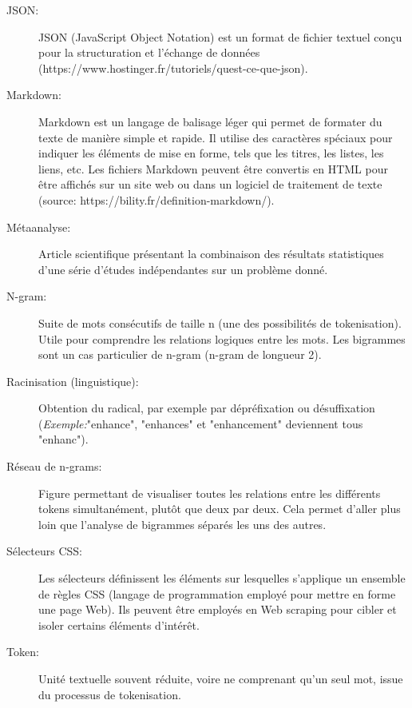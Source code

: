 \documentclass{book}
\begin{document}
\begin{description}

    \item[JSON:] JSON (JavaScript Object Notation) est un format de fichier textuel conçu pour la structuration et l’échange de données (https://www.hostinger.fr/tutoriels/quest-ce-que-json).

    \item[Markdown:] Markdown est un langage de balisage léger qui permet de
        formater du texte de manière simple et rapide. Il utilise des caractères
        spéciaux pour indiquer les éléments de mise en forme, tels que les titres, les
        listes, les liens, etc. Les fichiers Markdown peuvent être convertis en HTML
        pour être affichés sur un site web ou dans un logiciel de traitement de texte
        (source: https://bility.fr/definition-markdown/).

    \item[Métaanalyse:] Article scientifique présentant la combinaison des résultats statistiques d'une série d'études indépendantes sur un problème donné. 

    \item[N-gram:] Suite de mots consécutifs de taille n (une des possibilités
        de tokenisation). Utile pour comprendre les relations logiques entre les mots. Les bigrammes sont un cas particulier de n-gram (n-gram de longueur 2).

    \item [Racinisation (linguistique):] Obtention du radical, par exemple par dépréfixation ou \sloppy désuffixation (\textit{Exemple:}"enhance", "enhances" et "enhancement" deviennent tous "enhanc").
    
    \item [Réseau de n-grams:] Figure permettant de visualiser toutes les relations entre les différents tokens simultanément, plutôt que deux par deux. Cela permet d'aller plus loin que l'analyse de bigrammes séparés les uns des autres.

    \item[Sélecteurs CSS:] Les sélecteurs définissent les éléments sur
        lesquelles s'applique un ensemble de règles CSS (langage de programmation employé pour mettre en forme une page Web). Ils peuvent être employés en
        Web scraping pour cibler et isoler certains éléments d'intérêt.

    \item[Token:] Unité textuelle souvent réduite, voire ne comprenant qu'un
        seul mot, issue du processus de tokenisation.


\end{description}
\end{document}
